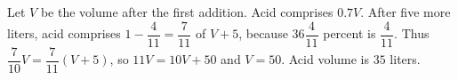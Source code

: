 Let $V$ be the volume after the first addition. Acid comprises $0.7V$. After five more liters, acid comprises $1-\dfrac{4}{11}=\dfrac{7}{11}$ of $V+5$, because $36\dfrac{4}{11}$ percent is $\dfrac{4}{11}$. Thus $\dfrac{7}{10}V=\dfrac{7}{11}(V+5)$, so $11V=10V+50$ and $V=50$. Acid volume is $\boxed{35}$ liters.

